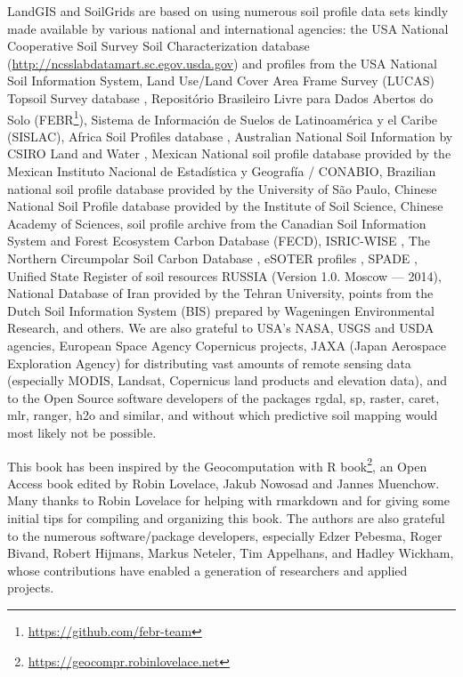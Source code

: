 \documentclass[graybox,natbib,nospthms,UStrade]{svmono}
\renewcommand{\href}[2]{#2 (\url{#1})}
\renewcommand{\href}[2]{#2\footnote{\url{#1}}}
\begin{document}
LandGIS and SoilGrids are based on using numerous soil profile data sets
kindly made available by various national and international agencies: the
USA National Cooperative Soil Survey Soil Characterization database
(\url{http://ncsslabdatamart.sc.egov.usda.gov}) and profiles from the USA
National Soil Information System, Land Use/Land Cover Area
Frame Survey (LUCAS) Topsoil Survey database \citep{Toth2013LUCAS},
Repositório Brasileiro Livre para Dados Abertos do Solo (\href{https://github.com/febr-team}{FEBR}),
Sistema de Información de Suelos de Latinoamérica y el Caribe (SISLAC),
Africa Soil Profiles database \citep{Leenaars2012}, Australian National Soil
Information by CSIRO Land and Water \citep{Karssies2011CSIRO, searle2014australian},
Mexican National soil profile database \citep{INEGI2000} provided by
the Mexican Instituto Nacional de Estadística y Geografía / CONABIO,
Brazilian national soil profile database \citep{cooper2005national}
provided by the University of São Paulo, Chinese
National Soil Profile database \citep{shangguan2013china} provided by the
Institute of Soil Science, Chinese Academy of Sciences, soil profile
archive from the Canadian Soil Information System \citep{macdonald1992cansis}
and Forest Ecosystem Carbon Database (FECD), ISRIC-WISE \citep{Batjes2009SUM},
The Northern Circumpolar Soil Carbon Database \citep{essd-5-3-2013}, eSOTER
profiles \citep{VanEngelen2012}, SPADE \citep{hollis2006spade}, Unified State Register
of soil resources RUSSIA (Version 1.0. Moscow --- 2014), National Database
of Iran provided by the Tehran University, points from the Dutch Soil
Information System (BIS) prepared by Wageningen Environmental Research,
and others. We are also grateful to USA's NASA, USGS and USDA agencies,
European Space Agency Copernicus projects, JAXA (Japan Aerospace Exploration Agency)
for distributing vast amounts of remote sensing data (especially MODIS, Landsat, Copernicus
land products and elevation data), and to the Open Source software developers
of the packages rgdal, sp, raster, caret, mlr, ranger, h2o and similar,
and without which predictive soil mapping would most likely not be possible.

This book has been inspired by \href{https://geocompr.robinlovelace.net}{the Geocomputation with R book}, an Open Access book edited by Robin Lovelace, Jakub Nowosad and Jannes Muenchow. Many thanks to Robin Lovelace for helping with rmarkdown and for giving some initial tips for compiling and organizing this book. The authors are also grateful to the numerous software/package developers, especially Edzer Pebesma, Roger Bivand, Robert Hijmans, Markus Neteler, Tim Appelhans, and Hadley Wickham, whose contributions have enabled a generation of researchers and applied projects.
\end{document}
